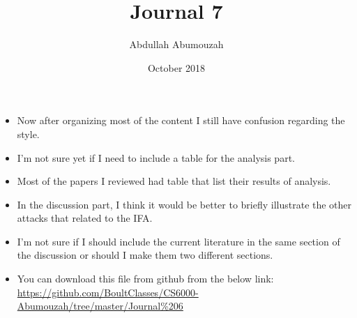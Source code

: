 \documentclass{article}
\title{Journal 7}
\author{Abdullah Abumouzah }
\date{October 2018}
\begin{document}
\maketitle


\begin{itemize}
    \item Now after organizing most of the content I still have confusion regarding the style.
    \item I'm not sure yet if I need to include a table for the analysis part. 
    \item Most of the papers I reviewed had table that list their results of analysis.
    \item In the discussion part, I think it would be better to briefly illustrate the other attacks  that related to the IFA.
    \item I'm not sure if I should include the current literature in the same section of the discussion or should I make them two different sections. 
    \item You can download this file from github from the below link: \url{https://github.com/BoultClasses/CS6000-Abumouzah/tree/master/Journal%206}
\end{itemize}
\end{document}
